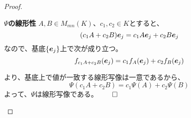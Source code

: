 \documentclass[../../../topic_linear-algebra]{subfiles}
\begin{document}
\begin{proof}
  \begin{subpattern}{\bfseries $\Psi$の線形性}
    $A,B\in M_{mn}(K)$、$c_1,c_2\in K$とすると、
  \begin{equation*}
    (c_1 A+c_2 B)\vb*{e}_j = c_1 A\vb*{e}_j + c_2 B\vb*{e}_j
  \end{equation*}
  なので、基底$\{\vb*{e}_j\}$上で次が成り立つ。
  \begin{equation*}
    f_{c_1 A+c_2 B}(\vb*{e}_j) = c_1 f_A(\vb*{e}_j) + c_2 f_B(\vb*{e}_j)
  \end{equation*}
  
  より、基底上で値が一致する線形写像は一意であるから、
  \begin{equation*}
    \Psi(c_1 A+c_2 B)=c_1 \Psi(A)+c_2 \Psi(B)
  \end{equation*}
  よって、$\Psi$は線形写像である。$\qed$
  \end{subpattern}  
\end{proof}
\end{document}
